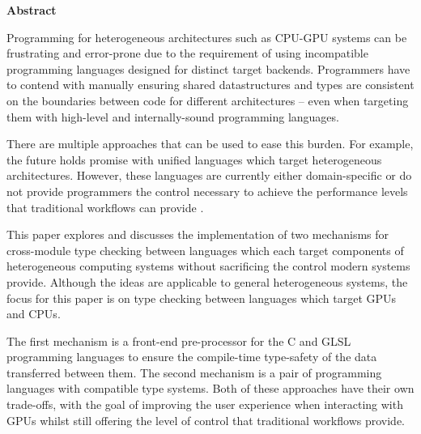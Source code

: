 \newpage
{\Huge \bf Abstract}
\vspace{24pt}






Programming for heterogeneous architectures such as CPU-GPU systems can be
frustrating and error-prone due to the requirement of using incompatible
programming languages designed for distinct target backends. Programmers have
to contend with manually ensuring shared datastructures and types are
consistent on the boundaries between code for different architectures -- even
when targeting them with high-level and internally-sound programming languages.

There are multiple approaches that can be used to ease this burden. For
example, the future holds promise with unified languages which target
heterogeneous architectures. However, these languages are currently either
domain-specific \cite{DSL1} \cite{DSL2} or do not provide programmers the
control necessary to achieve the performance levels that traditional workflows
can provide \cite{Lime2010} \cite{JCUDA2009}.

This paper explores and discusses the implementation of two mechanisms for
cross-module type checking between languages which each target components of
heterogeneous computing systems without sacrificing the control modern systems
provide. Although the ideas are applicable to general heterogeneous systems,
the focus for this paper is on type checking between languages which target
GPUs and CPUs.

The first mechanism is a front-end pre-processor for the C and GLSL programming
languages to ensure the compile-time type-safety of the data transferred
between them. The second mechanism is a pair of programming languages with
compatible type systems. Both of these approaches have their own trade-offs,
with the goal of improving the user experience when interacting with GPUs
whilst still offering the level of control that traditional workflows provide.

\newpage
\vspace*{\fill}
